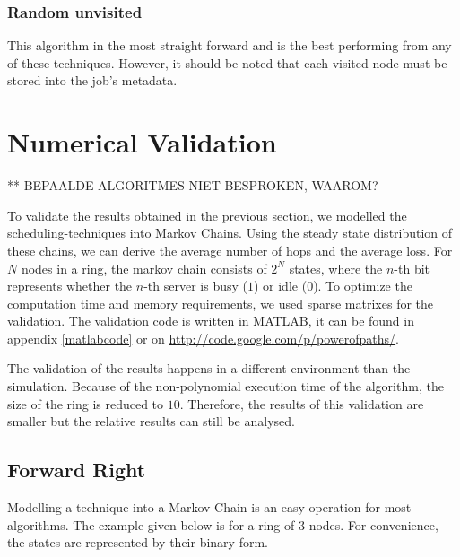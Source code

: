 \documentclass[10pt,a4paper]{article}
\begin{document}
\subsubsection*{Random unvisited}
This algorithm in the most straight forward and is the best performing from any of these techniques. However, it should be noted that each visited node must be stored into the job's metadata.

\section{Numerical Validation}
** BEPAALDE ALGORITMES NIET BESPROKEN, WAAROM?

\label{secvalidation}

To validate the results obtained in the previous section, we modelled the scheduling-techniques into Markov Chains. Using the steady state distribution of these chains, we can derive the average number of hops and the average loss.
For $N$ nodes in a ring, the markov chain consists of $2^N$ states, where the $n$-th bit represents whether the $n$-th server is busy ($1$) or idle ($0$). To optimize the computation time and memory requirements, we used sparse matrixes for the validation. The validation code is written in MATLAB, it can be found in appendix \ref{matlabcode} or on \url{http://code.google.com/p/powerofpaths/}.

The validation of the results happens in a different environment than the simulation. Because of the non-polynomial execution time of the algorithm, the size of the ring is reduced to $10$. Therefore, the results of this validation are smaller but the relative results can still be analysed.

\subsection{Forward Right}
\label{validateright}
Modelling a technique into a Markov Chain is an easy operation for most algorithms. The example given below is for a ring of 3 nodes. For convenience, the states are represented by their binary form.
\end{document}
